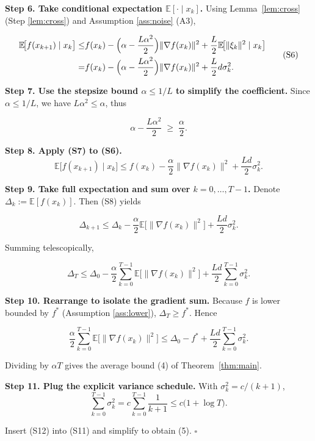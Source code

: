 \documentclass{article}
\newcommand{\E}{\mathbb{E}}
\begin{document}
\noindent\textbf{Step 6. Take conditional expectation $\E[\cdot\mid x_{k}]$.}
Using Lemma~\ref{lem:cross} (Step \ref{lem:cross}) and Assumption \ref{ass:noise}
(A3),

\[
\begin{aligned}
\E\!\bigl[f(x_{k+1})\mid x_{k}\bigr]
\le &
f(x_{k})
-\Bigl(\alpha-\frac{L\alpha^{2}}{2}\Bigr)\|\nabla f(x_{k})\|^{2}
+\frac{L}{2}\E\!\bigl[\|\xi_{k}\|^{2}\mid x_{k}\bigr] \\
=&
f(x_{k})
-\Bigl(\alpha-\frac{L\alpha^{2}}{2}\Bigr)\|\nabla f(x_{k})\|^{2}
+\frac{L}{2}d\sigma_{k}^{2}.
\end{aligned}
\tag{S6}
\]

\noindent\textbf{Step 7. Use the stepsize bound $\alpha\le 1/L$ to simplify
the coefficient.}
Since $\alpha\le1/L$, we have $L\alpha^{2}\le\alpha$, thus  

\[
\alpha-\frac{L\alpha^{2}}{2}\;\ge\;\frac{\alpha}{2}.
\tag{S7}
\]

\noindent\textbf{Step 8. Apply (S7) to (S6).}
\[
\E\!\bigl[f(x_{k+1})\mid x_{k}\bigr]
\le
f(x_{k})-\frac{\alpha}{2}\|\nabla f(x_{k})\|^{2}
+\frac{L d}{2}\sigma_{k}^{2}.
\tag{S8}
\]

\noindent\textbf{Step 9. Take full expectation and sum over $k=0,\dots,T-1$.}
Denote $\Delta_{k}:=\E[f(x_{k})]$. Then (S8) yields  

\[
\Delta_{k+1}\le\Delta_{k}-\frac{\alpha}{2}\E\!\bigl[\|\nabla f(x_{k})\|^{2}\bigr]
+\frac{L d}{2}\sigma_{k}^{2}.
\tag{S9}
\]

Summing telescopically,

\[
\Delta_{T}\le\Delta_{0}
-\frac{\alpha}{2}\sum_{k=0}^{T-1}\E\!\bigl[\|\nabla f(x_{k})\|^{2}\bigr]
+\frac{L d}{2}\sum_{k=0}^{T-1}\sigma_{k}^{2}.
\tag{S10}
\]

\noindent\textbf{Step 10. Rearrange to isolate the gradient sum.}
Because $f$ is lower bounded by $f^{*}$ (Assumption \ref{ass:lower}),
$\Delta_{T}\ge f^{*}$. Hence  

\[
\frac{\alpha}{2}\sum_{k=0}^{T-1}\E\!\bigl[\|\nabla f(x_{k})\|^{2}\bigr]
\le \Delta_{0}-f^{*}
+\frac{L d}{2}\sum_{k=0}^{T-1}\sigma_{k}^{2}.
\tag{S11}
\]

Dividing by $\alpha T$ gives the average bound (4) of Theorem~\ref{thm:main}.

\noindent\textbf{Step 11. Plug the explicit variance schedule.}
With $\sigma_{k}^{2}=c/(k+1)$,
\[
\sum_{k=0}^{T-1}\sigma_{k}^{2}=c\sum_{k=0}^{T-1}\frac{1}{k+1}
\le c\bigl(1+\log T\bigr).
\tag{S12}
\]

Insert (S12) into (S11) and simplify to obtain (5).  $\square$
\end{document}
